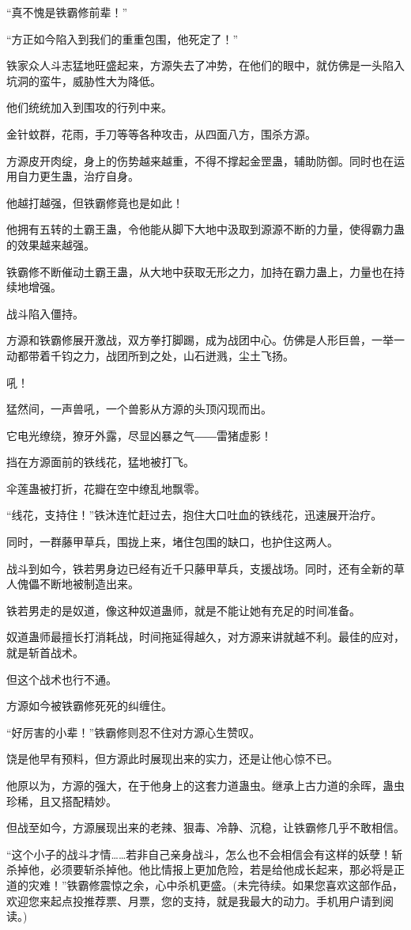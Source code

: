 \begin{this_body}
“真不愧是铁霸修前辈！”

“方正如今陷入到我们的重重包围，他死定了！”

铁家众人斗志猛地旺盛起来，方源失去了冲势，在他们的眼中，就仿佛是一头陷入坑洞的蛮牛，威胁性大为降低。

他们统统加入到围攻的行列中来。

金针蚊群，花雨，手刀等等各种攻击，从四面八方，围杀方源。

方源皮开肉绽，身上的伤势越来越重，不得不撑起金罡蛊，辅助防御。同时也在运用自力更生蛊，治疗自身。

他越打越强，但铁霸修竟也是如此！

他拥有五转的土霸王蛊，令他能从脚下大地中汲取到源源不断的力量，使得霸力蛊的效果越来越强。

铁霸修不断催动土霸王蛊，从大地中获取无形之力，加持在霸力蛊上，力量也在持续地增强。

战斗陷入僵持。

方源和铁霸修展开激战，双方拳打脚踢，成为战团中心。仿佛是人形巨兽，一举一动都带着千钧之力，战团所到之处，山石迸溅，尘土飞扬。

吼！

猛然间，一声兽吼，一个兽影从方源的头顶闪现而出。

它电光缭绕，獠牙外露，尽显凶暴之气――雷猪虚影！

挡在方源面前的铁线花，猛地被打飞。

伞莲蛊被打折，花瓣在空中缭乱地飘零。

“线花，支持住！”铁沐连忙赶过去，抱住大口吐血的铁线花，迅速展开治疗。

同时，一群藤甲草兵，围拢上来，堵住包围的缺口，也护住这两人。

战斗到如今，铁若男身边已经有近千只藤甲草兵，支援战场。同时，还有全新的草人傀儡不断地被制造出来。

铁若男走的是奴道，像这种奴道蛊师，就是不能让她有充足的时间准备。

奴道蛊师最擅长打消耗战，时间拖延得越久，对方源来讲就越不利。最佳的应对，就是斩首战术。

但这个战术也行不通。

方源如今被铁霸修死死的纠缠住。

“好厉害的小辈！”铁霸修则忍不住对方源心生赞叹。

饶是他早有预料，但方源此时展现出来的实力，还是让他心惊不已。

他原以为，方源的强大，在于他身上的这套力道蛊虫。继承上古力道的余晖，蛊虫珍稀，且又搭配精妙。

但战至如今，方源展现出来的老辣、狠毒、冷静、沉稳，让铁霸修几乎不敢相信。

“这个小子的战斗才情……若非自己亲身战斗，怎么也不会相信会有这样的妖孽！斩杀掉他，必须要斩杀掉他。他比情报上更加危险，若是给他成长起来，那必将是正道的灾难！”铁霸修震惊之余，心中杀机更盛。(未完待续。如果您喜欢这部作品，欢迎您来起点投推荐票、月票，您的支持，就是我最大的动力。手机用户请到阅读。)

\end{this_body}

